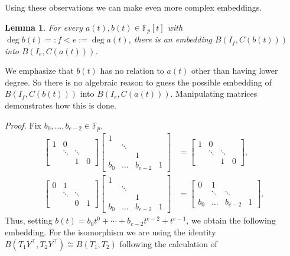 \documentclass[11pt]{article}
\numberwithin{equation}{section}
\theoremstyle{definition}
\theoremstyle{plain}
\numberwithin{equation}{section}
\theoremstyle{plain}       %
\newtheorem{lem}[equation]{Lemma}
\theoremstyle{remark}
\theoremstyle{definition}
\numberwithin{figure}{section}
\numberwithin{table}{section}
\newcommand{\bbF}{\mathbb{F}}  %
\begin{document}
Using these observations we can make even more complex embeddings.

\begin{lem}\label{lem:b(t)-a(t)}
	For every $a(t),b(t)\in \bbF_p[t]$ with $\deg b(t)=:f<e:=\deg a(t)$, there
	is an embedding $B(I_f, C(b(t)))$ into $B(I_e,C(a(t)))$.
\end{lem}
We emphasize that $b(t)$ has no relation to $a(t)$ other than having lower
degree.  So there is no algebraic reason to guess the possible embedding of
$B(I_f,C(b(t)))$ into $B(I_e,C(a(t)))$.  Manipulating matrices demonstrates how
this is done.
%

\smallskip
\noindent\emph{Proof.}
Fix $b_0,\dots, b_{e-2}\in\bbF_p$.
\begin{align}\label{eq:L1Y}
	\begin{bmatrix} 1 & 0 & & \\ & \ddots & \ddots \\ & & 1 & 0 \end{bmatrix}
	\begin{bmatrix} 1 & & \\ & \ddots & \\ & & 1 \\ b_0 & \dots & b_{e-2} & 1\end{bmatrix}
	& = 	\begin{bmatrix} 1 & 0 & & \\ & \ddots & \ddots &\\ & & 1& 0\end{bmatrix},\\
\label{eq:L2Y}
	\begin{bmatrix} 0 & 1 & & \\ & \ddots & \ddots \\ & & 0 & 1 \end{bmatrix}
	\begin{bmatrix} 1 & & \\ & \ddots & \\ & & 1 \\ b_0 & \dots & b_{e-2} & 1\end{bmatrix}
	& = 	\begin{bmatrix} 0 & 1 & & \\ & \ddots & \ddots &\\ b_0 &\dots & b_{e-2} & 1\end{bmatrix}.
\end{align}
Thus, setting $b(t)=b_0t^0 +\cdots +b_{e-2}t^{e-2}+t^{e-1}$, we obtain the
following embedding.  For the isomorphism we are using the identity
$B(T_1Y^\top,T_2Y^\top)\cong B(T_1,T_2)$ following the calculation of
\end{document}
